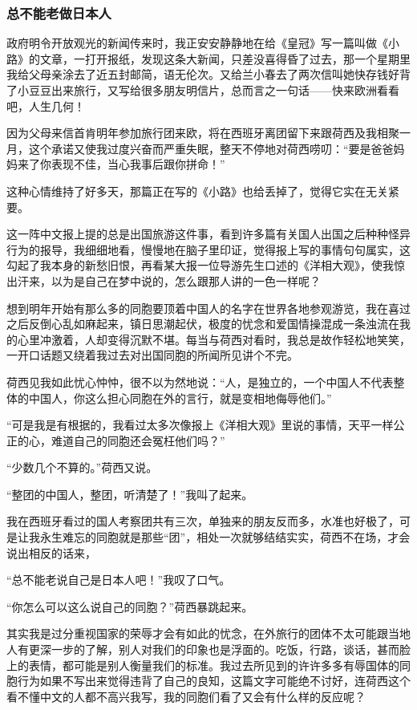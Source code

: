 \subsubsection*{总不能老做日本人}
\par 政府明令开放观光的新闻传来时，我正安安静静地在给《皇冠》写一篇叫做《小路》的文章，一打开报纸，发现这条大新闻，只差没喜得昏了过去，那一个星期里我给父母亲涂去了近五封邮简，语无伦次。又给兰小春去了两次信叫她快存钱好背了小豆豆出来旅行，又写给很多朋友明信片，总而言之一句话——快来欧洲看看吧，人生几何！
\par 因为父母来信首肯明年参加旅行团来欧，将在西班牙离团留下来跟荷西及我相聚一月，这个承诺又使我过度兴奋而严重失眠，整天不停地对荷西唠叨：“要是爸爸妈妈来了你表现不佳，当心我事后跟你拼命！”
\par 这种心情维持了好多天，那篇正在写的《小路》也给丢掉了，觉得它实在无关紧要。
\par 这一阵中文报上提的总是出国旅游这件事，看到许多篇有关国人出国之后种种怪异行为的报导，我细细地看，慢慢地在脑子里印证，觉得报上写的事情句句属实，这勾起了我本身的新愁旧恨，再看某大报一位导游先生口述的《洋相大观》，使我惊出汗来，以为是自己在梦中说的，怎么跟那人讲的一色一样呢？
\par 想到明年开始有那么多的同胞要顶着中国人的名字在世界各地参观游览，我在喜过之后反倒心乱如麻起来，镇日思潮起伏，极度的忧念和爱国情操混成一条浊流在我的心里冲激着，人却变得沉默不堪。每当与荷西对看时，我总是故作轻松地笑笑，一开口话题又绕着我过去对出国同胞的所闻所见讲个不完。
\par 荷西见我如此忧心忡忡，很不以为然地说：“人，是独立的，一个中国人不代表整体的中国人，你这么担心同胞在外的言行，就是变相地侮辱他们。”
\par “可是我是有根据的，我看过太多次像报上《洋相大观》里说的事情，天平一样公正的心，难道自己的同胞还会冤枉他们吗？”
\par “少数几个不算的。”荷西又说。
\par “整团的中国人，整团，听清楚了！”我叫了起来。
\par 我在西班牙看过的国人考察团共有三次，单独来的朋友反而多，水准也好极了，可是让我永生难忘的同胞就是那些“团”，相处一次就够结结实实，荷西不在场，才会说出相反的话来，
\par “总不能老说自己是日本人吧！”我叹了口气。
\par “你怎么可以这么说自己的同胞？”荷西暴跳起来。
\par 其实我是过分重视国家的荣辱才会有如此的忧念，在外旅行的团体不太可能跟当地人有更深一步的了解，别人对我们的印象也是浮面的。吃饭，行路，谈话，甚而脸上的表情，都可能是别人衡量我们的标准。我过去所见到的许许多多有辱国体的同胞行为如果不写出来觉得违背了自己的良知，这篇文字可能绝不讨好，连荷西这个看不懂中文的人都不高兴我写，我的同胞们看了又会有什么样的反应呢？
